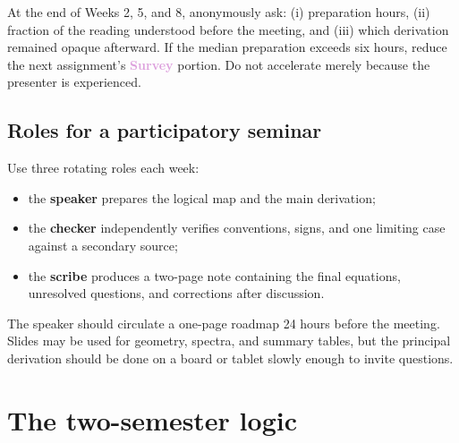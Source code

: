 \documentclass[11pt]{article}
\newcommand{\survey}{\textcolor{plum}{\textbf{Survey}}}
\begin{document}
\begin{checkpoint}
At the end of Weeks 2, 5, and 8, anonymously ask: (i) preparation hours,
(ii) fraction of the reading understood before the meeting, and (iii) which
derivation remained opaque afterward.  If the median preparation exceeds six
hours, reduce the next assignment's \survey{} portion.  Do not accelerate merely
because the presenter is experienced.
\end{checkpoint}

\subsection{Roles for a participatory seminar}

Use three rotating roles each week:

\begin{itemize}
  \item the \textbf{speaker} prepares the logical map and the main derivation;
  \item the \textbf{checker} independently verifies conventions, signs, and one
  limiting case against a secondary source;
  \item the \textbf{scribe} produces a two-page note containing the final
  equations, unresolved questions, and corrections after discussion.
\end{itemize}

The speaker should circulate a one-page roadmap 24 hours before the meeting.
Slides may be used for geometry, spectra, and summary tables, but the principal
derivation should be done on a board or tablet slowly enough to invite questions.

\section{The two-semester logic}
\end{document}
